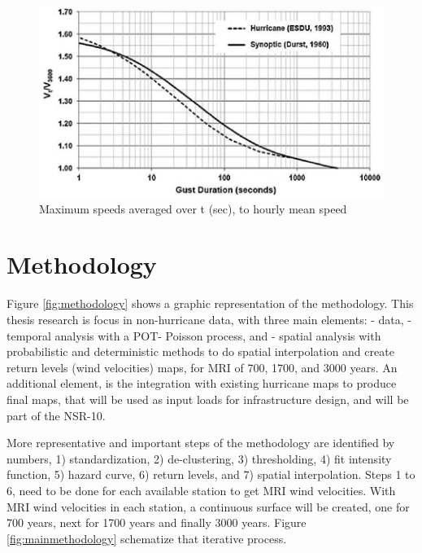 \documentclass[12pt,oneside]{reedthesis}
\begin{document}
\footnotesize
\begin{figure}
\includegraphics[width=6.14in]{figure/durst} \caption{Maximum speeds averaged over t (sec), to hourly mean speed}\label{fig:durstcurve}
\end{figure}
\normalsize

\hypertarget{rmd-method}{%
\chapter{Methodology}\label{rmd-method}}

Figure \ref{fig:methodology} shows a graphic representation of the methodology. This thesis research is focus in non-hurricane data, with three main elements: - data, - temporal analysis with a POT- Poisson process, and - spatial analysis with probabilistic and deterministic methods to do spatial interpolation and create return levels (wind velocities) maps, for MRI of 700, 1700, and 3000 years. An additional element, is the integration with existing hurricane maps to produce final maps, that will be used as input loads for infrastructure design, and will be part of the NSR-10.

More representative and important steps of the methodology are identified by numbers, 1) standardization, 2) de-clustering, 3) thresholding, 4) fit intensity function, 5) hazard curve, 6) return levels, and 7) spatial interpolation. Steps 1 to 6, need to be done for each available station to get MRI wind velocities. With MRI wind velocities in each station, a continuous surface will be created, one for 700 years, next for 1700 years and finally 3000 years. Figure \ref{fig:mainmethodology} schematize that iterative process.
\end{document}
